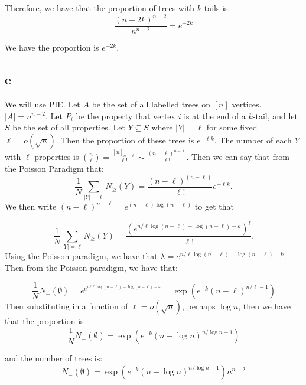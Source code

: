 \documentclass[]{article}
\begin{document}
Therefore, we have that the proportion of trees with $k$ tails is:
\begin{equation}
	\frac{(n - 2k)^{n - 2}}{n^{n - 2}} = e^{-2k}
\end{equation}

We have the proportion is $e^{-2k}$. 

\subsection{e}
We will use PIE. Let $A$ be the set of all labelled trees on $[n]$ vertices. $|A| = n^{n - 2}$. Let $P_i$ be the property that vertex $i$ is at the end of a $k$-tail, and let $S$ be the set of all properties. Let $Y \subseteq S$ where $|Y| = \ell$ for some fixed $\ell = o(\sqrt{n}) $. Then the proportion of these trees is $e^{-\ell k}$. The number of each $Y$ with $\ell$ properties is $\binom{n}{\ell} = \frac{[n]_{n - \ell}}{\ell!} \sim \frac{(n - \ell)^{n - \ell}}{\ell!}$. Then we can say that from the Poisson Paradigm that:
\begin{equation}
	\frac{1}{N}\sum_{|Y| = \ell}N_\geq(Y) = \frac{(n - \ell)^{(n - \ell)}}{\ell!} e^{-\ell k}.
\end{equation}
We then write $(n - \ell)^{n - \ell} = e^{(n - \ell) \log(n - \ell)}$ to get that 

\begin{equation}
	\frac{1}{N}\sum_{|Y| = \ell}N_\geq(Y) = \frac{(e^{ n/\ell \log(n - \ell) -\log(n - \ell) - k})^\ell}{\ell!}.
\end{equation}
Using the Poisson paradigm, we have that $\lambda = e^{ n/\ell \log(n - \ell) -\log(n - \ell) - k}$. 
Then from the Poisson paradigm, we have that:

\begin{equation}
	\frac{1}{N}N_= (\emptyset) = e^{e^{ n/\ell \log(n - \ell) -\log(n - \ell) - k}} = \exp \left(e^{-k} (n - \ell)^{n/ \ell - 1}\right)
\end{equation}
Then substituting in a function of $\ell = o(\sqrt{n})$, perhaps $\log n$, then we have that the proportion is
\begin{equation}
	\frac{1}{N}N_= (\emptyset)= \exp \left(e^{-k} (n - \log n)^{n/ \log n - 1}\right)
\end{equation}

and the number of trees is:
\begin{equation}
	N_= (\emptyset)= \exp \left(e^{-k} (n - \log n)^{n/ \log n - 1}\right) n^{n - 2}
\end{equation}
\end{document}
